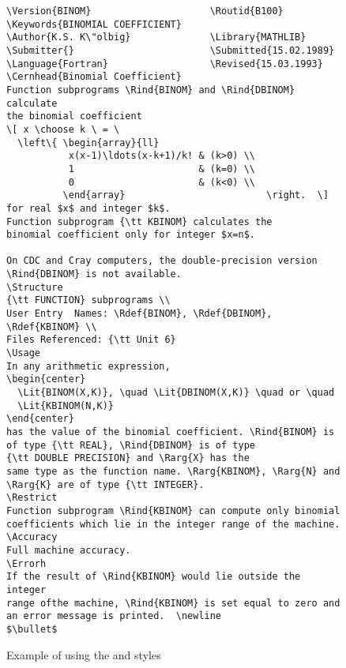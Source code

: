 \begin{figure}[p]
  \begin{sideways}
   \begin{minipage}[b]{\textheight}
    \begin{minipage}[b]{.49\textwidth}
    \scriptsize%
    \begin{verbatim}
\Version{BINOM}                     \Routid{B100}
\Keywords{BINOMIAL COEFFICIENT}
\Author{K.S. K\"olbig}              \Library{MATHLIB}
\Submitter{}                        \Submitted{15.02.1989}
\Language{Fortran}                  \Revised{15.03.1993}
\Cernhead{Binomial Coefficient}
Function subprograms \Rind{BINOM} and \Rind{DBINOM} calculate
the binomial coefficient
\[ x \choose k \ = \ 
  \left\{ \begin{array}{ll}
           x(x-1)\ldots(x-k+1)/k! & (k>0) \\
           1                      & (k=0) \\
           0                      & (k<0) \\
          \end{array}                         \right.  \]
for real $x$ and integer $k$.
Function subprogram {\tt KBINOM} calculates the
binomial coefficient only for integer $x=n$.

On CDC and Cray computers, the double-precision version
\Rind{DBINOM} is not available.
\Structure
{\tt FUNCTION} subprograms \\
User Entry  Names: \Rdef{BINOM}, \Rdef{DBINOM}, \Rdef{KBINOM} \\
Files Referenced: {\tt Unit 6}
\Usage
In any arithmetic expression,
\begin{center}
  \Lit{BINOM(X,K)}, \quad \Lit{DBINOM(X,K)} \quad or \quad
  \Lit{KBINOM(N,K)}
\end{center}
has the value of the binomial coefficient. \Rind{BINOM} is 
of type {\tt REAL}, \Rind{DBINOM} is of type 
{\tt DOUBLE PRECISION} and \Rarg{X} has the
same type as the function name. \Rarg{KBINOM}, \Rarg{N} and 
\Rarg{K} are of type {\tt INTEGER}.
\Restrict
Function subprogram \Rind{KBINOM} can compute only binomial
coefficients which lie in the integer range of the machine.
\Accuracy
Full machine accuracy.
\Errorh
If the result of \Rind{KBINOM} would lie outside the integer 
range ofthe machine, \Rind{KBINOM} is set equal to zero and 
an error message is printed.  \newline
$\bullet$
\end{verbatim}
\end{minipage}
\hfill
\begin{minipage}[b]{.49\textwidth}
\end{minipage}
\caption{Example of using the \protect{} 
         and \protect{} styles}
\label{fig:cernlibexa}
\end{minipage}
\end{sideways}
\end{figure}

